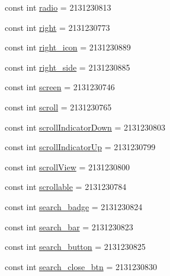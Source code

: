 \begin{DoxyCompactItemize}
\item 
const int \mbox{\hyperlink{class_f_w_p_s___app_1_1_droid_1_1_resource_1_1_id_ab932fea117d7e22750d088b4b413eb34}{radio}} = 2131230813
\item 
const int \mbox{\hyperlink{class_f_w_p_s___app_1_1_droid_1_1_resource_1_1_id_a07e83bd95a6498e1ec94e232666a0192}{right}} = 2131230773
\item 
const int \mbox{\hyperlink{class_f_w_p_s___app_1_1_droid_1_1_resource_1_1_id_ac525a303ab6325014991e728c6a7dc56}{right\+\_\+icon}} = 2131230889
\item 
const int \mbox{\hyperlink{class_f_w_p_s___app_1_1_droid_1_1_resource_1_1_id_a0d6c641e204c4b69de499d40a14e938e}{right\+\_\+side}} = 2131230885
\item 
const int \mbox{\hyperlink{class_f_w_p_s___app_1_1_droid_1_1_resource_1_1_id_ab96e0f34b263446365dba657f6981ab2}{screen}} = 2131230746
\item 
const int \mbox{\hyperlink{class_f_w_p_s___app_1_1_droid_1_1_resource_1_1_id_a5106129b4c64f0dbd7479324cfe5ab5e}{scroll}} = 2131230765
\item 
const int \mbox{\hyperlink{class_f_w_p_s___app_1_1_droid_1_1_resource_1_1_id_a5a59691ab58af11ded51023da94074a7}{scroll\+Indicator\+Down}} = 2131230803
\item 
const int \mbox{\hyperlink{class_f_w_p_s___app_1_1_droid_1_1_resource_1_1_id_a3f7f415fa1a528034f93c568c177c0c3}{scroll\+Indicator\+Up}} = 2131230799
\item 
const int \mbox{\hyperlink{class_f_w_p_s___app_1_1_droid_1_1_resource_1_1_id_a6c0cf7d1338d9b1f01400b175743a785}{scroll\+View}} = 2131230800
\item 
const int \mbox{\hyperlink{class_f_w_p_s___app_1_1_droid_1_1_resource_1_1_id_a3577d4fea0910716f9e0d806dedd8e65}{scrollable}} = 2131230784
\item 
const int \mbox{\hyperlink{class_f_w_p_s___app_1_1_droid_1_1_resource_1_1_id_a3f611534b973ded07a7dc6d84b47952f}{search\+\_\+badge}} = 2131230824
\item 
const int \mbox{\hyperlink{class_f_w_p_s___app_1_1_droid_1_1_resource_1_1_id_adf070d7b350dd7ca95cac9d85efc6c94}{search\+\_\+bar}} = 2131230823
\item 
const int \mbox{\hyperlink{class_f_w_p_s___app_1_1_droid_1_1_resource_1_1_id_a60c1d69f97afd94f4b88e05ad774ce4e}{search\+\_\+button}} = 2131230825
\item 
const int \mbox{\hyperlink{class_f_w_p_s___app_1_1_droid_1_1_resource_1_1_id_a9eca78d34806d77b9e73d78b7e9a7f07}{search\+\_\+close\+\_\+btn}} = 2131230830

\end{DoxyCompactItemize}
